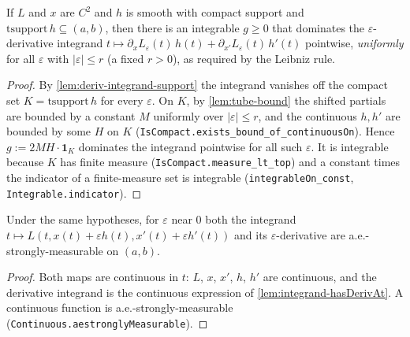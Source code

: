 \begin{lemma}
    \label{lem:dominating-bound}
    \leanok
    If $L$ and $x$ are $C^2$ and $h$ is smooth with compact support and
    $\mathrm{tsupport}\,h \subseteq (a,b)$, then there is an integrable
    $g \ge 0$ that dominates the $\varepsilon$-derivative integrand
    $t \mapsto \partial_x L_\varepsilon(t)\,h(t) + \partial_{x'} L_\varepsilon(t)\,
    h'(t)$ pointwise, \emph{uniformly} for all $\varepsilon$ with $|\varepsilon|
    \le r$ (a fixed $r > 0$), as required by the Leibniz rule.
\end{lemma}
\begin{proof}
    By \cref{lem:deriv-integrand-support} the integrand vanishes off the compact
    set $K = \mathrm{tsupport}\,h$ for every $\varepsilon$. On $K$, by
    \cref{lem:tube-bound} the shifted partials are bounded by a constant $M$
    uniformly over $|\varepsilon| \le r$, and the continuous $h, h'$ are bounded
    by some $H$ on $K$ (\texttt{IsCompact.exists\_bound\_of\_continuousOn}). Hence
    $g := 2MH \cdot \mathbf{1}_K$ dominates the integrand pointwise for all such
    $\varepsilon$. It is integrable because $K$ has finite measure
    (\texttt{IsCompact.measure\_lt\_top}) and a constant times the indicator of a
    finite-measure set is integrable (\texttt{integrableOn\_const},
    \texttt{Integrable.indicator}).
\end{proof}

\begin{lemma}
    \label{lem:integrand-ae-measurable}
    \leanok
    Under the same hypotheses, for $\varepsilon$ near $0$ both the integrand
    $t \mapsto L(t, x(t) + \varepsilon h(t), x'(t) + \varepsilon h'(t))$ and its
    $\varepsilon$-derivative are a.e.-strongly-measurable on $(a,b)$.
\end{lemma}
\begin{proof}
    Both maps are continuous in $t$: $L$, $x$, $x'$, $h$, $h'$ are continuous,
    and the derivative integrand is the continuous expression of
    \cref{lem:integrand-hasDerivAt}. A continuous function is
    a.e.-strongly-measurable (\texttt{Continuous.aestronglyMeasurable}).
\end{proof}

